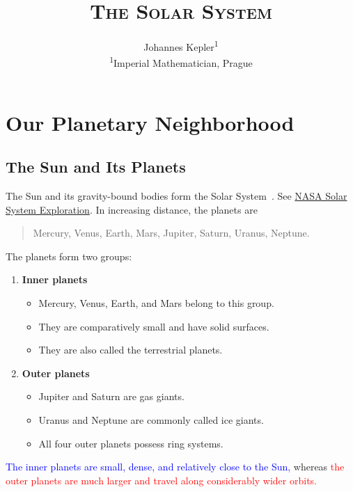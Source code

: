 \documentclass[11pt]{article}
\title{\textsc{\LARGE The Solar System}}
\author{Johannes Kepler\textsuperscript{1}\\[0.5em]
        {\small \textsuperscript{1}Imperial Mathematician, Prague}}
\date{}
\begin{document}
\maketitle
\thispagestyle{empty}

\tableofcontents
\newpage

\section{Our Planetary Neighborhood}

\subsection{The Sun and Its Planets}
The Sun and its gravity-bound bodies form the Solar System~\cite{kepler1609}. See
\href{https://science.nasa.gov/solar-system/}{NASA Solar System Exploration}. In
increasing distance, the planets are
\begin{quote}
    Mercury, Venus, Earth, Mars, Jupiter, Saturn, Uranus, Neptune.
\end{quote}
The planets form two groups:
\begin{enumerate}[label=(\Roman*)]
    \item \textbf{Inner planets}
        \begin{itemize}[label=$\dagger$]
            \item Mercury, Venus, Earth, and Mars belong to this group.
            \item They are comparatively small and have solid surfaces.
            \item They are also called the terrestrial planets.
        \end{itemize}
    \item \textbf{Outer planets}
        \begin{itemize}[label=$\dagger$]
            \item Jupiter and Saturn are gas giants.
            \item Uranus and Neptune are commonly called ice giants.
            \item All four outer planets possess ring systems.
        \end{itemize}
\end{enumerate}

\textcolor{blue}{The inner planets are small, dense, and relatively close to the
Sun,} whereas \textcolor{red}{the outer planets are much larger and travel along
considerably wider orbits.}
\end{document}
